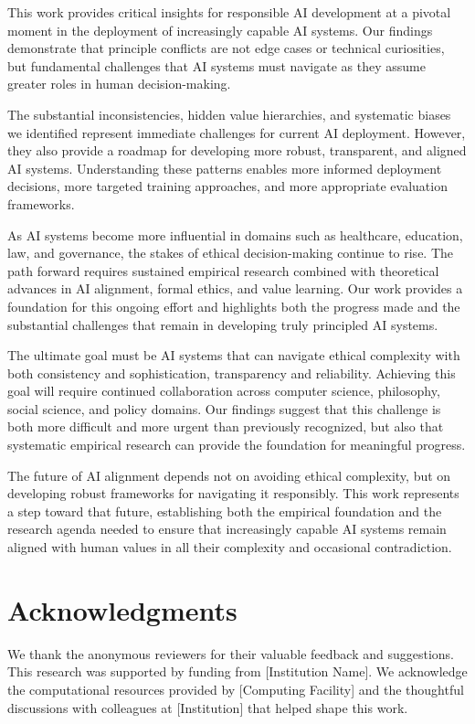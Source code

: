 \documentclass[11pt,a4paper]{article}
\begin{document}
This work provides critical insights for responsible AI development at a pivotal moment in the deployment of increasingly capable AI systems. Our findings demonstrate that principle conflicts are not edge cases or technical curiosities, but fundamental challenges that AI systems must navigate as they assume greater roles in human decision-making.

The substantial inconsistencies, hidden value hierarchies, and systematic biases we identified represent immediate challenges for current AI deployment. However, they also provide a roadmap for developing more robust, transparent, and aligned AI systems. Understanding these patterns enables more informed deployment decisions, more targeted training approaches, and more appropriate evaluation frameworks.

As AI systems become more influential in domains such as healthcare, education, law, and governance, the stakes of ethical decision-making continue to rise. The path forward requires sustained empirical research combined with theoretical advances in AI alignment, formal ethics, and value learning. Our work provides a foundation for this ongoing effort and highlights both the progress made and the substantial challenges that remain in developing truly principled AI systems.

The ultimate goal must be AI systems that can navigate ethical complexity with both consistency and sophistication, transparency and reliability. Achieving this goal will require continued collaboration across computer science, philosophy, social science, and policy domains. Our findings suggest that this challenge is both more difficult and more urgent than previously recognized, but also that systematic empirical research can provide the foundation for meaningful progress.

The future of AI alignment depends not on avoiding ethical complexity, but on developing robust frameworks for navigating it responsibly. This work represents a step toward that future, establishing both the empirical foundation and the research agenda needed to ensure that increasingly capable AI systems remain aligned with human values in all their complexity and occasional contradiction.

\section*{Acknowledgments}

We thank the anonymous reviewers for their valuable feedback and suggestions. This research was supported by funding from [Institution Name]. We acknowledge the computational resources provided by [Computing Facility] and the thoughtful discussions with colleagues at [Institution] that helped shape this work.

\clearpage

\appendix
\end{document}
